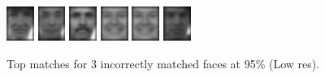 \begin{figure}[hbt]
  \includegraphics[width=0.08\textwidth]{../results/L_rez/incorrect95/3/5.jpg}
  \includegraphics[width=0.08\textwidth]{../results/L_rez/incorrect95/3/6.jpg}
  \includegraphics[width=0.08\textwidth]{../results/L_rez/incorrect95/3/7.jpg}
  \includegraphics[width=0.08\textwidth]{../results/L_rez/incorrect95/3/8.jpg}
  \includegraphics[width=0.08\textwidth]{../results/L_rez/incorrect95/3/8.jpg}
  \includegraphics[width=0.08\textwidth]{../results/L_rez/incorrect95/3/10.jpg}
  \caption{Top matches for 3 incorrectly matched faces at 95\% (Low res).}
  \label{fig:incorrect95_l}
\end{figure}

~\vfill
